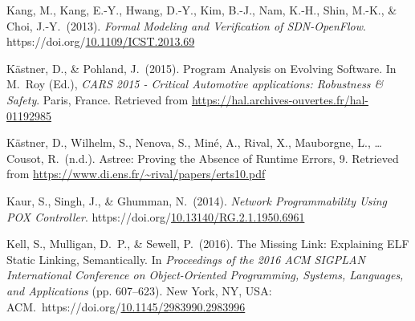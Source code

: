 \documentclass[12pt,twoside]{article}
\begin{document}
{\begin{thebibliography}{1079}
\mdbibitemlabel{}Kang, M., Kang, E.-Y., Hwang, D.-Y., Kim, B.-J., Nam, K.-H., Shin, M.-K., \& Choi, J.-Y.~(2013). \emph{Formal Modeling and Verification of SDN-OpenFlow}. https://doi.org/\href{https://dx.doi.org/10.1109/ICST.2013.69}{10.1109/ICST.2013.69}%

\mdbibitemlabel{}Kästner, D., \& Pohland, J.~(2015). Program Analysis on Evolving Software. In M.~Roy (Ed.), \emph{CARS 2015 - Critical Automotive applications: Robustness \& Safety}. Paris, France. Retrieved from \href{https://hal.archives-ouvertes.fr/hal-01192985}{{\ttfamily https://\hspace{0pt}hal.\hspace{0pt}archives-\hspace{0pt}ouvertes.\hspace{0pt}fr/\hspace{0pt}hal-\hspace{0pt}01192985}}%

\mdbibitemlabel{}Kästner, D., Wilhelm, S., Nenova, S., Miné, A., Rival, X., Mauborgne, L., … Cousot, R.~(n.d.). Astree: Proving the Absence of Runtime Errors, 9. Retrieved from \href{https://www.di.ens.fr/~rival/papers/erts10.pdf}{{\ttfamily https://\hspace{0pt}www.\hspace{0pt}di.\hspace{0pt}ens.\hspace{0pt}fr/\hspace{0pt}\textasciitilde{}rival/\hspace{0pt}papers/\hspace{0pt}erts10.\hspace{0pt}pdf}}%

\mdbibitemlabel{}Kaur, S., Singh, J., \& Ghumman, N.~(2014). \emph{Network Programmability Using POX Controller}. https://doi.org/\href{https://dx.doi.org/10.13140/RG.2.1.1950.6961}{10.13140/RG.2.1.1950.6961}%

\mdbibitemlabel{}Kell, S., Mulligan, D.~P., \& Sewell, P.~(2016). The Missing Link: Explaining ELF Static Linking, Semantically. In \emph{Proceedings of the 2016 ACM SIGPLAN International Conference on Object-Oriented Programming, Systems, Languages, and Applications} (pp. 607–623). New York, NY, USA: ACM.~https://doi.org/\href{https://dx.doi.org/10.1145/2983990.2983996}{10.1145/2983990.2983996}%


\end{thebibliography}}
\end{document}
